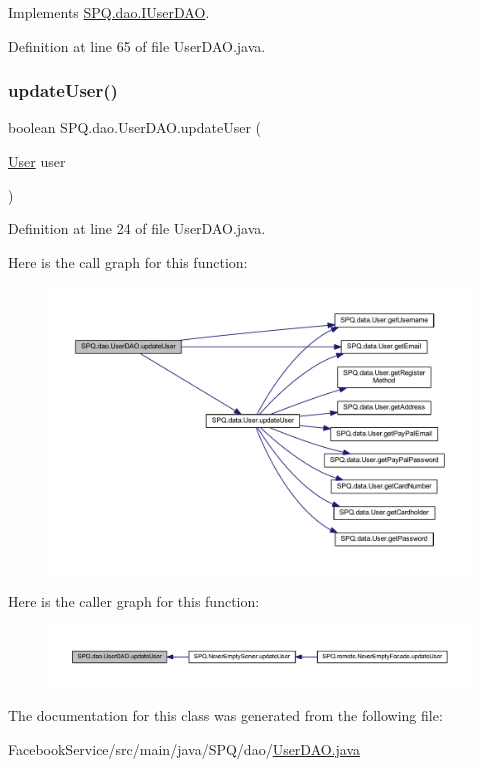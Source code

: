 Implements \mbox{\hyperlink{interface_s_p_q_1_1dao_1_1_i_user_d_a_o_a286f084c9e920d1ce196658ab63ab0af}{S\+P\+Q.\+dao.\+I\+User\+D\+AO}}.



Definition at line 65 of file User\+D\+A\+O.\+java.

\mbox{\label{class_s_p_q_1_1dao_1_1_user_d_a_o_a525b7db52aab94cfe24aeac14949504e}} 
\subsubsection{\texorpdfstring{update\+User()}{updateUser()}}
{\footnotesize\ttfamily boolean S\+P\+Q.\+dao.\+User\+D\+A\+O.\+update\+User (\begin{DoxyParamCaption}\item[{\mbox{\hyperlink{class_s_p_q_1_1data_1_1_user}{User}}}]{user }\end{DoxyParamCaption})}



Definition at line 24 of file User\+D\+A\+O.\+java.

Here is the call graph for this function\+:
\nopagebreak
\begin{figure}[H]
\begin{center}
\leavevmode
\includegraphics[width=350pt]{class_s_p_q_1_1dao_1_1_user_d_a_o_a525b7db52aab94cfe24aeac14949504e_cgraph}
\end{center}
\end{figure}
Here is the caller graph for this function\+:
\nopagebreak
\begin{figure}[H]
\begin{center}
\leavevmode
\includegraphics[width=350pt]{class_s_p_q_1_1dao_1_1_user_d_a_o_a525b7db52aab94cfe24aeac14949504e_icgraph}
\end{center}
\end{figure}


The documentation for this class was generated from the following file\+:\begin{DoxyCompactItemize}
\item 
Facebook\+Service/src/main/java/\+S\+P\+Q/dao/\mbox{\hyperlink{_facebook_service_2src_2main_2java_2_s_p_q_2dao_2_user_d_a_o_8java}{User\+D\+A\+O.\+java}}\end{DoxyCompactItemize}
